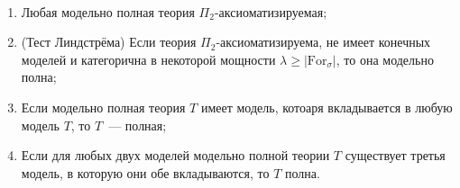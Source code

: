 \begin{prop} \ 

    \begin{enumerate}
        \item Любая модельно полная теория $\Pi_2$-аксиоматизируемая;
        \item (Тест Линдстрёма) Если теория $\Pi_2$-аксиоматизируема, не имеет конечных моделей и категорична в некоторой мощности $\lambda \geq |\text{For}_\sigma|$, то она модельно полна; 
        \item Если модельно полная теория $T$ имеет модель, котоаря вкладывается в любую модель $T$, то $T$~— полная; 
        \item Если для любых двух моделей модельно полной теории $T$ существует третья модель, в которую они обе вкладываются, то $T$ полна.  
    \end{enumerate}
\end{prop}


